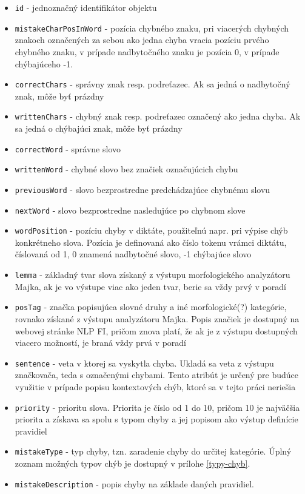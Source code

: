 \documentclass[12pt,oneside]{fithesis2}
\begin{document}
      \begin{itemize}
	\item \texttt{id} - jednoznačný identifikátor objektu
	\item \texttt{mistakeCharPosInWord} - pozícia chybného znaku, pri viacerých chybných znakoch označených za sebou ako jedna chyba vracia pozíciu prvého chybného znaku, v prípade nadbytočného znaku je pozícia 0, v prípade chýbajúceho -1.
	\item \texttt{correctChars} - správny znak resp. podreťazec. Ak sa jedná o nadbytočný znak, môže byť prázdny
	\item \texttt{writtenChars} - chybný znak resp. podreťazec označený ako jedna chyba. Ak sa jedná o chýbajúci znak, môže byť prázdny
	\item \texttt{correctWord} - správne slovo
	\item \texttt{writtenWord} - chybné slovo bez značiek označujúcich chybu
	\item \texttt{previousWord} - slovo bezprostredne predchádzajúce chybnému slovu
	\item \texttt{nextWord} - slovo bezprostredne nasledujúce po chybnom slove
	\item \texttt{wordPosition} - pozíciu chyby v diktáte, použiteľnú napr. pri výpise chýb konkrétneho slova. Pozícia je definovaná ako číslo tokenu vrámci diktátu, číslovaná od 1, 0 znamená nadbytočné slovo, -1 chýbajúce slovo
	\item \texttt{lemma} - základný tvar slova získaný z výstupu morfologického analyzátoru Majka\cite{majka}, ak je vo výstupe viac ako jeden tvar, berie sa vždy prvý v poradí
	\item \texttt{posTag} - značka popisujúca slovné druhy a iné morfologické(?) kategórie, rovnako získané z výstupu analyzátoru Majka. Popis značiek je dostupný na webovej stránke NLP FI\cite{nlpfi}, pričom znova platí, že ak je z výstupu dostupných viacero možností, je braná vždy prvá v poradí
	\item \texttt{sentence} - veta v ktorej sa vyskytla chyba. Ukladá sa veta z výstupu značkovača, teda s označenými chybami. Tento atribút je určený pre budúce využitie v prípade popisu kontextových chýb, ktoré sa v tejto práci neriešia
	\item \texttt{priority} - prioritu slova. Priorita je číslo od 1 do 10, pričom 10 je najväčšia priorita a získava sa spolu s typom chyby a jej popisom ako výstup definície pravidiel
	\item \texttt{mistakeType} - typ chyby, tzn. zaradenie chyby do určitej kategórie. Úplný zoznam možných typov chýb je dostupný v prílohe \ref{typy-chyb}.
	\item \texttt{mistakeDescription} - popis chyby na základe daných pravidiel.
\end{itemize}
\end{document}
